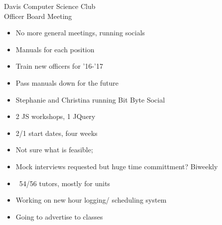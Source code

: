 \documentclass{article}
\begin{document}
\begin{Minutes}{Davis Computer Science Club\\Officer Board Meeting}




\maketitle

\begin{itemize}
    \item No more general meetings, running socials
    \item Manuals for each position
    \item Train new officers for '16-'17
    \item Pass manuals down for the future
\end{itemize}

\begin {itemize}
    \item Stephanie and Christina running Bit Byte Social
\end {itemize}


\begin {itemize} 
    \item 2 JS workshops, 1 JQuery
    \item 2/1 start dates, four weeks
\end {itemize}

\begin {itemize}
    \item Not sure what is feasible;
    \item Mock interviews requested but huge time committment? Biweekly
\end {itemize}

\begin{itemize}
    \item ~54/56 tutors, mostly for units
    \item Working on new hour logging/ scheduling system
    \item Going to advertise to classes
\end {itemize}


\end{Minutes}
\end{document}
